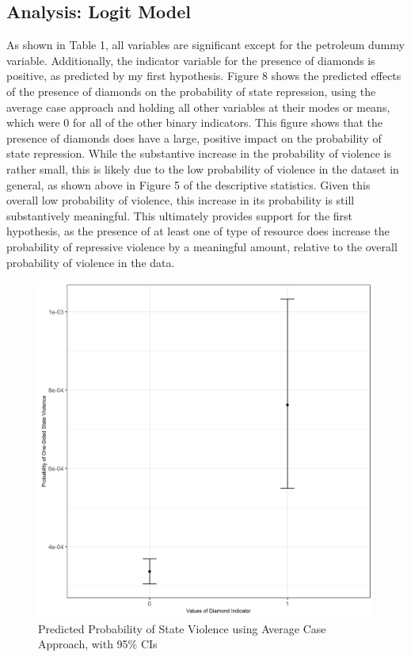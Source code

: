 \subsection*{Analysis: Logit Model}
As shown in Table 1, all variables are significant except for the petroleum dummy variable. Additionally, the indicator variable for the presence of diamonds is positive, as predicted by my first hypothesis. Figure 8 shows the predicted effects of the presence of diamonds on the probability of state repression, using the average case approach and holding all other variables at their modes or means, which were 0 for all of the other binary indicators. This figure shows that the presence of diamonds does have a large, positive impact on the probability of state repression. While the substantive increase in the probability of violence is rather small, this is likely due to the low probability of violence in the dataset in general, as shown above in Figure 5 of the descriptive statistics. Given this overall low probability of violence, this increase in its probability is still substantively meaningful. This ultimately provides support for the first hypothesis, as the presence of at least one of type of resource does increase the probability of repressive violence by a meaningful amount, relative to the overall probability of violence in the data. 

\begin{figure}
	\includegraphics[scale=.8]{fig8}
	\caption{Predicted Probability of State Violence using Average Case Approach, with 95\% CIs}
\end{figure} 

